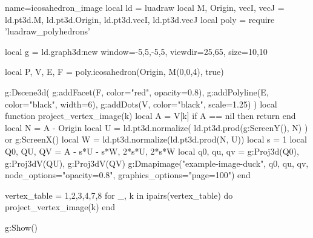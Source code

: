 \documentclass{standalone}
\begin{document}
\begin{luadraw}{name=icosahedron_image}
local ld = luadraw
local M, Origin, vecI, vecJ = ld.pt3d.M, ld.pt3d.Origin, ld.pt3d.vecI, ld.pt3d.vecJ
local poly = require 'luadraw_polyhedrons'

local g = ld.graph3d:new{
    window={-5,5,-5,5}, 
    viewdir={25,65}, size={10,10}
}

local P, V, E, F = poly.icosahedron(Origin, M(0,0,4), true)

g:Dscene3d(
    g:addFacet(F, {color="red", opacity=0.8}),
    g:addPolyline(E, {color="black", width=6}),
    g:addDots(V, {color="black", scale=1.25})
)
local function project_vertex_image(k)
    local A = V[k]
    if A == nil then
        return
    end
    local N = A - Origin
    local U = ld.pt3d.normalize( ld.pt3d.prod(g:ScreenY(), N) ) or g:ScreenX()
    local W = ld.pt3d.normalize(ld.pt3d.prod(N, U))
    local s = 1
    local Q0, QU, QV = A - s*U - s*W, 2*s*U, 2*s*W
    local q0, qu, qv = g:Proj3d(Q0), g:Proj3dV(QU), g:Proj3dV(QV)
    g:Dmapimage("example-image-duck", {q0, qu, qv}, 
        {node_options="opacity=0.8", graphics_options="page=100"})
end

vertex_table = {1,2,3,4,7,8}
for _, k in ipairs(vertex_table) do
    project_vertex_image(k)
end

g:Show()
\end{luadraw}
\end{document}
